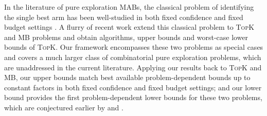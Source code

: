 \documentclass{article}
\newcommand{\MultiIdent}{\textsc{TopK}\xspace}
\newcommand{\MultiBandit}{\textsc{MB}\xspace}
\begin{document}
In the literature of pure exploration MABs, the classical problem of identifying the single best arm has been well-studied in both fixed confidence and fixed budget settings \citep{mannor2004sample,even2006action,bubeck2010pure,audibert2010best,gabillon2012best,jamieson2013lil,jamieson2014best}.
A flurry of recent work extend this classical problem to \MultiIdent and \MultiBandit problems and obtain algorithms, upper bounds \citep{kalyanakrishnan2010efficient,kalyanakrishnan2012pac,zhou2014optimal,bubeck2013multiple,NIPS2011_4478,gabillon2012best,kaufmann2013information} and worst-case lower bounds of \MultiIdent \citep{kalyanakrishnan2012pac,zhou2014optimal}.
Our framework encompasses these two problems as special cases and covers a much larger class of combinatorial pure exploration problems, which are unaddressed in the current literature.
Applying our results back to \MultiIdent and \MultiBandit, our upper bounds match best available problem-dependent bounds up to constant factors \citep{gabillon2012best,bubeck2013multiple,kalyanakrishnan2012pac} in both fixed confidence and fixed budget settings; and our lower bound provides the first problem-dependent lower bounds for these two problems, which are conjectured earlier by \citet{kalyanakrishnan2012pac} and \citet{bubeck2013multiple}.

\vspace{-1em}
\end{document}
